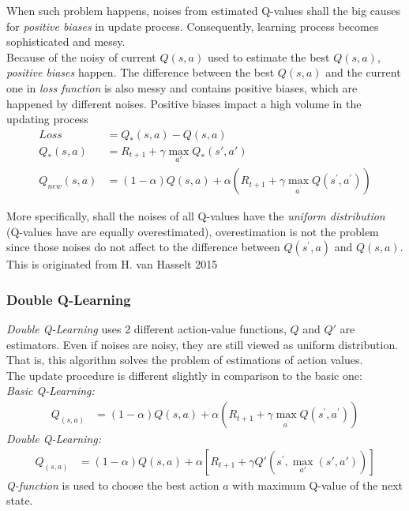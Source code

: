 \documentclass{article}
\begin{document}
When such problem happens, noises from estimated Q-values shall the big causes for \textit{positive biases} in update process. Consequently, learning process becomes sophisticated and messy.\\

Because of the noisy of current $Q(s, a)$ used to estimate the best $Q(s, a)$, \textit{positive biases} happen. The difference between the best $Q(s, a)$ and the current one in \textit{loss function} is also messy and contains positive biases, which are happened by different noises. Positive biases impact a high volume in the updating process
\begin{align}
    Loss &= Q_{*}\left(s, a\right) - Q\left(s, a\right) \nonumber \\
    Q_{*}\left(s, a\right) &= R_{t+1} + \gamma \underset{a'}{\max}Q_{*}\left(s', a'\right) \nonumber \\
    Q_{new}\left( s,a\right) &=\left( 1-\alpha \right) Q\left( s,a\right)  +\alpha {{\left(R_{t+1}+\gamma \max_{a^{^{\prime }}}Q\left( s^{\prime },a^{\prime }\right) \right) }}\nonumber 
\end{align}

More specifically, shall the noises of all Q-values have the \textit{uniform distribution} (Q-values have are equally overestimated), overestimation is not the problem since those noises do not affect to the difference between $Q(s^{\prime}, a)$ and $Q(s, a)$. This is originated from H. van Hasselt 2015 \cite{DQL}
\subsubsection*{Double Q-Learning}
\textit{Double Q-Learning} uses 2 different action-value functions, $Q$ and $Q'$ are estimators. Even if noises are noisy, they are still viewed as uniform distribution. That is, this algorithm solves the problem of estimations of action values.\\

The update procedure is different slightly in comparison to the basic one:\\

\textit{Basic Q-Learning:}
\begin{align}
   Q_{\left(s,a\right)} &= \left( 1-\alpha \right) Q\left( s,a\right)  +\alpha {{\left(R_{t+1}+\gamma \max_{a^{^{\prime }}}Q\left( s^{\prime },a^{\prime }\right) \right) }}\nonumber
\end{align}
\textit{Double Q-Learning:}
\begin{align}
   Q_{\left(s,a\right)} &= \left( 1-\alpha \right) Q\left( s,a\right)  +\alpha {{\left[R_{t+1}+\gamma Q'\left( s^{\prime }, \underset{a'}{\max}(s', a')\right) \right] }}\nonumber 
\end{align}
\textit{Q-function} is used to choose the best action $a$ with maximum Q-value of the next state.
\end{document}

